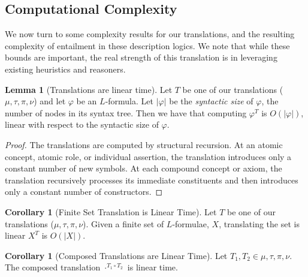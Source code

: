 \documentclass[letterpaper]{article} %
\theoremstyle{definition}
\newtheorem{lemma}{Lemma}
\theoremstyle{definition}
\theoremstyle{definition}
\theoremstyle{definition}
\theoremstyle{definition}
\newtheorem{corollary}[theorem]{Corollary}
\begin{document}
\subsection{Computational Complexity}
We now turn to some complexity results for our translations, and the resulting complexity of entailment in these description logics. We note that while these bounds are important, the real strength of this translation is in leveraging existing heuristics and reasoners.
\begin{lemma}[Translations are linear time]\label{lem:t-linear}
Let $T$ be one of our translations ($\mu,\tau,\pi,\nu$) and let $\varphi$ be an $L$-formula. Let $|\varphi|$ be the \textit{syntactic size} of $\varphi$, the number of nodes in its syntax tree. Then we have that computing $\varphi^T$ is $O(|\varphi|)$, linear with respect to the syntactic size of $\varphi$.
\end{lemma}
\begin{proof}
The translations are computed by structural recursion. At an atomic concept, atomic role, or individual assertion, the translation introduces only a constant number of new symbols. At each compound concept or axiom, the translation recursively processes its immediate constituents and then introduces only a constant number of  constructors.
\end{proof}
\begin{corollary}[Finite Set Translation is Linear Time]\label{cor:Finset-Lin} 
    Let $T$ be one of our translations ($\mu,\tau,\pi,\nu$). Given a finite set of $L$-formulae, $X$, translating the set is linear $X^T$ is $O(|X|)$. 
\end{corollary}
\begin{corollary}[Composed Translations are Linear Time]\label{cor:Comp-Lin} 
    Let $T_1,T_2 \in {\mu,\tau,\pi,\nu}$. The composed translation $\cdot^{T_1 \circ T_2}$ is linear time.
\end{corollary}
\end{document}
